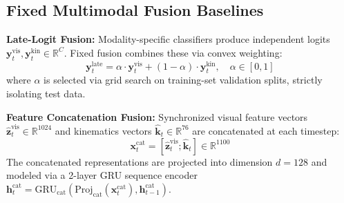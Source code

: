 \documentclass[10pt,journal]{IEEEtran}
\begin{document}
\subsection{Fixed Multimodal Fusion Baselines}
\textbf{Late-Logit Fusion:} Modality-specific classifiers produce independent logits $\mathbf{y}_t^{\text{vis}}, \mathbf{y}_t^{\text{kin}} \in \mathbb{R}^{C}$. Fixed fusion combines these via convex weighting:
\begin{equation}
\mathbf{y}_t^{\text{late}} = \alpha \cdot \mathbf{y}_t^{\text{vis}} + (1 - \alpha) \cdot \mathbf{y}_t^{\text{kin}}, \quad \alpha \in [0, 1]
\end{equation}
where $\alpha$ is selected via grid search on training-set validation splits, strictly isolating test data.

\textbf{Feature Concatenation Fusion:} Synchronized visual feature vectors $\hat{\mathbf{z}}_t^{\text{vis}} \in \mathbb{R}^{1024}$ and kinematics vectors $\hat{\mathbf{k}}_t \in \mathbb{R}^{76}$ are concatenated at each timestep:
\begin{equation}
\mathbf{x}_t^{\text{cat}} = [\hat{\mathbf{z}}_t^{\text{vis}}; \hat{\mathbf{k}}_t] \in \mathbb{R}^{1100}
\end{equation}
The concatenated representations are projected into dimension $d=128$ and modeled via a 2-layer GRU sequence encoder $\mathbf{h}_t^{\text{cat}} = \text{GRU}_{\text{cat}}(\text{Proj}_{\text{cat}}(\mathbf{x}_t^{\text{cat}}), \mathbf{h}_{t-1}^{\text{cat}})$.
\end{document}
